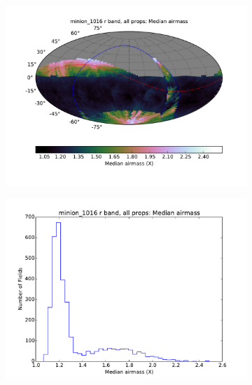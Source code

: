 



\begin{figure}[tbh!]
\begin{subfigure}[b]{0.49\textwidth}
\includegraphics[angle=0,width=0.99\hsize,clip]{figs/cadence/minion_1016_Median_airmass_r_band_all_props_OPSI_SkyMap.pdf}
\end{subfigure}
\hfill
\begin{subfigure}[b]{0.49\textwidth}
\includegraphics[angle=0,width=0.99\hsize,clip]{figs/cadence/minion_1016_Median_airmass_r_band_all_props_OPSI_Histogram.pdf}

\end{subfigure}
\end{figure}
